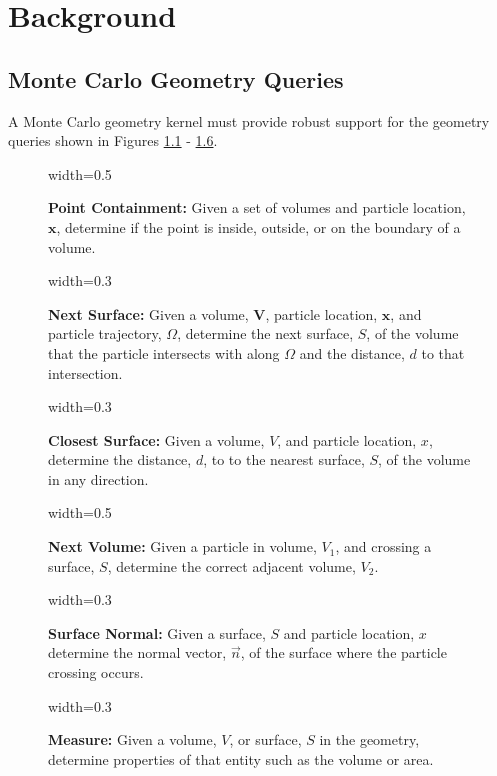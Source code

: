 \newcommand{\geomQuery}[4] {
  \begin{figure}[H]
    \centering
    {width=#3\textwidth}
    \caption[Explanation of the \textit{#1} geometry query]{\textbf{#1:}#4}
    \label{fig:#1}
  \end{figure}
}

\renewcommand{\thefootnote}{\fnsymbol{footnote}}


\chapter{Background}\label{ch:background}

\section{Monte Carlo Geometry Queries}\label{sec:mc-geom-queries}

A Monte Carlo geometry kernel must provide robust support for the geometry
queries shown in Figures \ref{fig:Point Containment} - \ref{fig:Measure}.

\geomQuery{Point Containment}{plc_query}{0.5}{
Given a set of volumes and particle location, $\mathbf{x}$, determine if the
point is inside, outside, or on the boundary of a volume.
}

\geomQuery{Next Surface}{dtb_query}{0.3}{
Given a volume, $\mathbf{V}$, particle location, $\mathbf{x}$, and particle
trajectory, \boldmath$\Omega$, determine the next surface, \boldmath$S$, of the
volume that the particle intersects with along \boldmath$\Omega$ and the
distance, \boldmath$d$ to that intersection.
}

\geomQuery{Closest Surface}{ctl_query}{0.3}{
Given a volume, \boldmath$V$, and particle location, \boldmath$x$, determine
the distance, \boldmath$d$, to to the nearest surface, \boldmath$S$, of the
volume in any direction.
}

\geomQuery{Next Volume}{next_vol_query}{0.5}{
Given a particle in volume, \boldmath$V_1$, and crossing a surface, \boldmath$S$,
determine the correct adjacent volume, \boldmath$V_2$.
}

\geomQuery{Surface Normal}{normal_query}{0.3}{
Given a surface, \boldmath$S$ and particle location, \boldmath$x$ determine
the normal vector, \boldmath$\vec{n}$, of the surface where the particle
crossing occurs.}

\geomQuery{Measure}{measure_query}{0.3}{
Given a volume, \boldmath$V$, or surface, \boldmath$S$ in the geometry,
determine properties of that entity such as the volume or area.
}

